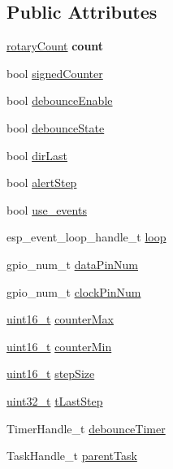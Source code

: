 \subsection*{Public Attributes}
\begin{DoxyCompactItemize}
\item 
\mbox{\label{structrotaryEncoder_a2512cc7964ea59e6e6d2640cb8e4c652}} 
\hyperlink{unionrotaryCount}{rotary\+Count} {\bfseries count}
\item 
bool \hyperlink{structrotaryEncoder_acdcf654ac998975abe284087194a57d7}{signed\+Counter}
\item 
bool \hyperlink{structrotaryEncoder_ae43c122ca1f7443eb96c728ee6021c59}{debounce\+Enable}
\item 
bool \hyperlink{structrotaryEncoder_acfd9ee89d53cb92cabb2f9e39a7d8025}{debounce\+State}
\item 
bool \hyperlink{structrotaryEncoder_a27690330142cf2a5f9e20d10b95f5dd1}{dir\+Last}
\item 
bool \hyperlink{structrotaryEncoder_a4262a64e13a2c9f3fb8c803651defde3}{alert\+Step}
\item 
bool \hyperlink{structrotaryEncoder_a99b65d81c239da055c1095045e075cf7}{use\+\_\+events}
\item 
esp\+\_\+event\+\_\+loop\+\_\+handle\+\_\+t \hyperlink{structrotaryEncoder_a1304512c915331287c57500e1f93a334}{loop}
\item 
gpio\+\_\+num\+\_\+t \hyperlink{structrotaryEncoder_ad1538a6197a4cb5f3d73c2e7ffbbdf9b}{data\+Pin\+Num}
\item 
gpio\+\_\+num\+\_\+t \hyperlink{structrotaryEncoder_ae945fca8835282470bb42d3e54f09ce7}{clock\+Pin\+Num}
\item 
\hyperlink{vl53l0x__types_8h_a273cf69d639a59973b6019625df33e30}{uint16\+\_\+t} \hyperlink{structrotaryEncoder_a790920314cd8441c59003222041bcd84}{counter\+Max}
\item 
\hyperlink{vl53l0x__types_8h_a273cf69d639a59973b6019625df33e30}{uint16\+\_\+t} \hyperlink{structrotaryEncoder_a7bf3d54d80fb253ac7fc62dee0417600}{counter\+Min}
\item 
\hyperlink{vl53l0x__types_8h_a273cf69d639a59973b6019625df33e30}{uint16\+\_\+t} \hyperlink{structrotaryEncoder_acc07389798d5ac386aef417d5999a10e}{step\+Size}
\item 
\hyperlink{vl53l0x__types_8h_a435d1572bf3f880d55459d9805097f62}{uint32\+\_\+t} \hyperlink{structrotaryEncoder_ab0862deb9b39139e677189738940dc2c}{t\+Last\+Step}
\item 
Timer\+Handle\+\_\+t \hyperlink{structrotaryEncoder_a1365b198e34d623c25c601664e07d388}{debounce\+Timer}
\item 
Task\+Handle\+\_\+t \hyperlink{structrotaryEncoder_ab489c2097bddeb8a77a52e58bf7526b7}{parent\+Task}
\end{DoxyCompactItemize}


